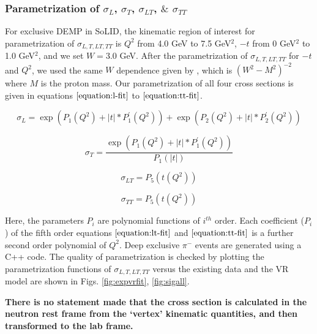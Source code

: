 \subsubsection{Parametrization of $\sigma_{L}$, $\sigma_{T}$, $\sigma_{LT}$, 
$\&$ $\sigma_{TT}$
\label{sec:parametrization}}

For exclusive DEMP in SoLID, the kinematic region of interest for
parametrization of $\sigma_{L,T,LT,TT}$ is $Q^2$ from 4.0 GeV to 7.5 GeV$^2$,
$-t$ from 0 GeV$^2$ to 1.0 GeV$^2$, and we set $W=3.0$ GeV. After the
parametrization of $\sigma_{L,T,LT,TT}$ for $-t$ and $Q^2$, we used the same
$W$ dependence given by \cite{gmhuber}, which is $(W^2-M^2)^{-2}$ where $M$ is
the proton mass.  Our parametrization of all four cross sections is given in
equations $\ref{equation:l-fit}$ to $\ref{equation:tt-fit}$.

\begin{equation}
        \sigma_{L} = \exp{(P_1(Q^2) + |t| * P^{\prime}_1(Q^2))}
        + \exp{(P_2(Q^2) + |t| * P^{\prime}_2(Q^2))}
     \label{equation:l-fit}
\end{equation}

\begin{equation}
        \sigma_{T} = \frac{\exp{(P_1(Q^2) + |t| *
        P^{\prime}_1(Q^2))}}{P_{1}(|t|)}
     \label{equation:t-fit}
\end{equation}

\begin{equation}
        \sigma_{LT} = P_{5}(t(Q^2))
     \label{equation:lt-fit}
\end{equation}

\begin{equation}
        \sigma_{TT} = P_{5}(t(Q^2))       
     \label{equation:tt-fit}
\end{equation}

Here, the parameters $P_{i}$ are polynomial functions of $i^{th}$ order. Each
coefficient ($P_{i}$) of the fifth order equations $\ref{equation:lt-fit}$ and
$\ref{equation:tt-fit}$ is a further second order polynomial of $Q^2$. Deep
exclusive $\pi^{-}$ events are generated using a C++ code. The quality of
parametrization is checked by plotting the parametrization functions of
$\sigma_{L,T,LT,TT}$ versus the existing data and the VR model are shown in 
Figs. \ref{fig:expvrfit}, \ref{fig:sigall}.

{\bf There is no statement made that the cross section is calculated in the
  neutron rest frame from the `vertex' kinematic quantities, and then
  transformed to the lab frame.}

